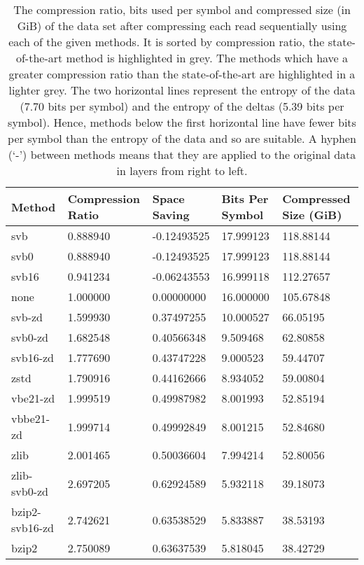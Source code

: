 \begin{table}
    \caption{\label{tab:results-space} The compression ratio, bits used per
	symbol and compressed size (in GiB) of the data set after compressing
	each read sequentially using each of the given methods. It is
	sorted by compression ratio, the state-of-the-art method is
	highlighted in grey.
	The methods which have a greater compression ratio than the
	state-of-the-art are highlighted in a lighter grey.
	The two horizontal lines represent the entropy of
	the data (7.70 bits per symbol) and the entropy of the deltas (5.39
	bits per symbol). Hence, methods below the first horizontal line have
	fewer bits per symbol than the entropy of the data and so are suitable.
	A hyphen (`-') between methods means that they are applied to the
	original data in layers from right to left.}
	\begin{tabular}{|l|l|l|l|l|}
	    \hline
		Method & Compression Ratio & Space Saving & Bits Per Symbol & Compressed Size (GiB) \\
\hline
		svb    &0.888940  &-0.12493525 &17.999123 &118.88144\\
            svb0    &0.888940  &-0.12493525 &17.999123 &118.88144\\
              svb16    &0.941234  &-0.06243553 &16.999118 &112.27657\\
               none    &1.000000  & 0.00000000 &16.000000 &105.67848\\
             svb-zd    &1.599930  & 0.37497255 &10.000527 & 66.05195\\
         svb0-zd    &1.682548  & 0.40566348 & 9.509468 & 62.80858\\
           svb16-zd    &1.777690  & 0.43747228 & 9.000523 & 59.44707\\
               zstd    &1.790916  & 0.44162666 & 8.934052 & 59.00804\\
           vbe21-zd    &1.999519  & 0.49987982 & 8.001993 & 52.85194\\
          vbbe21-zd    &1.999714  & 0.49992849 & 8.001215 & 52.84680\\
               zlib    &2.001465  & 0.50036604 & 7.994214 & 52.80056\\
	       \hline
    zlib-svb0-zd    &2.697205  & 0.62924589 & 5.932118 & 39.18073\\
     bzip2-svb16-zd    &2.742621  & 0.63538529 & 5.833887 & 38.53193\\
              bzip2    &2.750089  & 0.63637539 & 5.818045 & 38.42729\\

\end{tabular}
\end{table}
